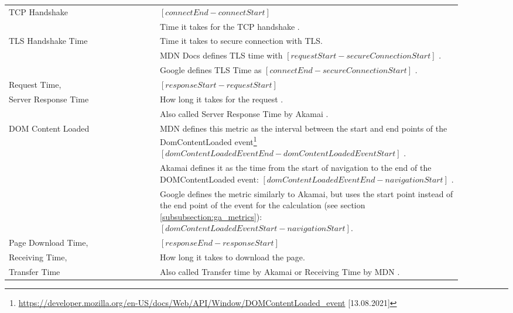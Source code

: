 \begin{center}
\begin{longtable}{ | p{0.3\linewidth} | p{0.6\linewidth} | }
	\hline
	TCP Handshake %
	& $[connectEnd - connectStart]$ \\
	& Time it takes for the TCP handshake \cite{2021MDNNavigationAndResourceTimings}. \\

	\hline
	TLS Handshake Time
	& Time it takes to secure connection with TLS.  \\
	& MDN Docs defines TLS time with $[requestStart - secureConnectionStart]$ \cite{2021MDNNavigationAndResourceTimings}. \\
	& Google defines TLS Time as $[connectEnd - secureConnectionStart]$ \cite{2020Wagner}. \\

	\hline
	Request Time, 
	& $[responseStart - requestStart]$ \\ 
	Server Response Time & How long it takes for the request \cite{2021MDNNavigationAndResourceTimings}. \\
	& Also called Server Response Time by Akamai \cite{2018Akamai}. \\
	
	\hline
	DOM Content Loaded
	& MDN defines this metric as the interval between the start and end points of the DomContentLoaded event\footnote{\url{https://developer.mozilla.org/en-US/docs/Web/API/Window/DOMContentLoaded_event} [13.08.2021]} $[domContentLoadedEventEnd - domContentLoadedEventStart]$ \cite{2021MDNNavigationAndResourceTimings}. \\
	& Akamai defines it as the time from the start of navigation to the end of the DOMContentLoaded event: $[domContentLoadedEventEnd - navigationStart]$ \cite{2018Akamai}. \\
	& Google defines the metric similarly to Akamai, but uses the start point instead of the end point of the event for the calculation (see section \ref{subsubsection:ga_metrics}):
$[domContentLoadedEventStart - navigationStart]$. \\

	\hline
	Page Download Time,
	& $[responseEnd - responseStart]$ \\
	Receiving Time,  & How long it takes to download the page. \\
	Transfer Time & Also called Transfer time by Akamai \cite{2018Akamai} or Receiving Time by MDN \cite{2021MDNLatency}. \\


\end{longtable}
\end{center}
